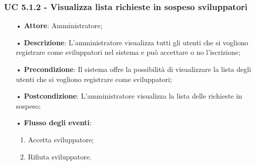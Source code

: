 \subsubsection{UC 5.1.2 - Visualizza lista richieste in sospeso sviluppatori}
\begin{itemize}

\item[•] \textbf{Attore}: Amministratore;
\item[•] \textbf{Descrizione}: L'amministratore visualizza tutti gli utenti che si vogliono registrare come sviluppatori nel sistema e può accettare o no l'iscrizione;
\item[•] \textbf{Precondizione}: Il sistema offre la possibilità di visualizzare la lista degli utenti che si vogliono registrare come sviluppatori;
\item[•] \textbf{Postcondizione}: L'amministratore visualizza la lista delle richieste in sospeso;
\item[•] \textbf{Flusso degli eventi}:
\begin{enumerate}
\item Accetta sviluppatore;
\item Rifiuta sviluppatore.
\end{enumerate}

\end{itemize}

